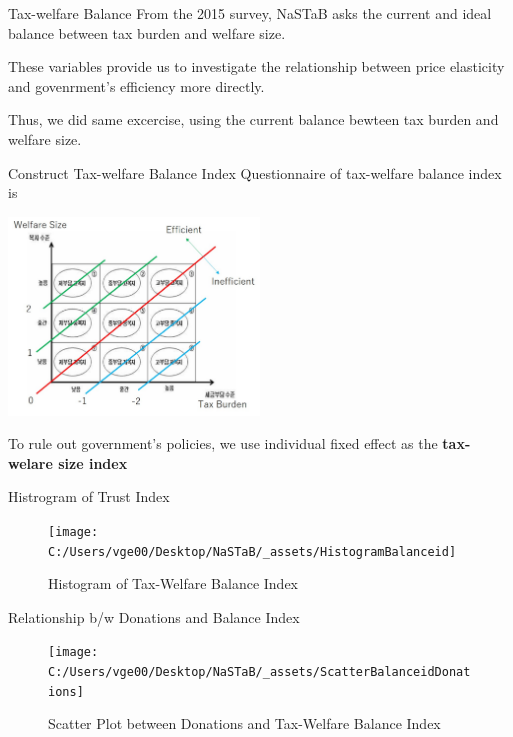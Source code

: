 \documentclass[
  ignorenonframetext,
]{beamer}
\begin{document}
\begin{frame}{Tax-welfare Balance}
\protect\hypertarget{tax-welfare-balance}{}
From the 2015 survey, NaSTaB asks the current and ideal balance between
tax burden and welfare size.

These variables provide us to investigate the relationship between price
elasticity and govenrment's efficiency more directly.

Thus, we did same excercise, using the current balance bewteen tax
burden and welfare size.
\end{frame}

\begin{frame}{Construct Tax-welfare Balance Index}
\protect\hypertarget{construct-tax-welfare-balance-index}{}
Questionnaire of tax-welfare balance index is

\includegraphics[width=0.5\textwidth,height=\textheight]{_assets/BalanceQuestion.jpg}

To rule out government's policies, we use individual fixed effect as the
\textbf{tax-welare size index}
\end{frame}

\begin{frame}{Histrogram of Trust Index}
\protect\hypertarget{histrogram-of-trust-index-1}{}
\begin{figure}
\texttt{[image: C:/Users/vge00/Desktop/NaSTaB/\_assets/HistogramBalanceid]} \caption{Histogram of Tax-Welfare Balance Index}\label{fig:unnamed-chunk-8}
\end{figure}
\end{frame}

\begin{frame}{Relationship b/w Donations and Balance Index}
\protect\hypertarget{relationship-bw-donations-and-balance-index}{}
\begin{figure}
\texttt{[image: C:/Users/vge00/Desktop/NaSTaB/\_assets/ScatterBalanceidDonations]} \caption{Scatter Plot between Donations and Tax-Welfare Balance Index}\label{fig:unnamed-chunk-9}
\end{figure}
\end{frame}
\end{document}
